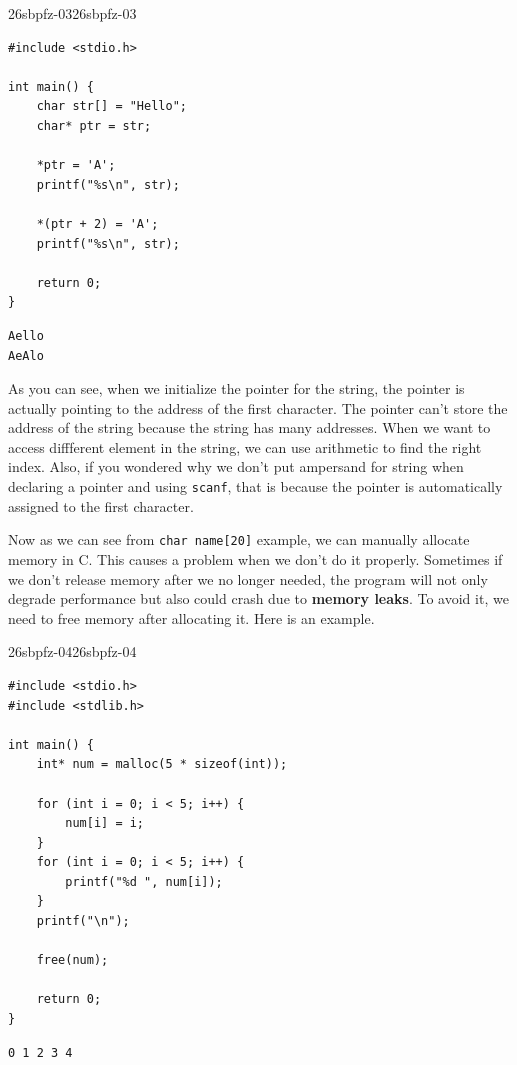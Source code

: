 \documentclass[../../../main.tex]{subfiles}
\begin{document}
\begin{cbox}{26sbpfz-03}{26sbpfz-03}
\begin{lstlisting}[style=cstyle]
#include <stdio.h>

int main() {
    char str[] = "Hello";
    char* ptr = str;

    *ptr = 'A';
    printf("%s\n", str);

    *(ptr + 2) = 'A';
    printf("%s\n", str);

    return 0;
}
\end{lstlisting}
\end{cbox}
\begin{outputbox}
\begin{lstlisting}[style=basic]
Aello
AeAlo
\end{lstlisting}
\end{outputbox}

As you can see, when we initialize the pointer for the string,
the pointer is actually pointing to the address of the first
character. The pointer can't store the address of the string because
the string has many addresses. When we want to access diffferent
element in the string, we can use arithmetic to find the right index.
Also, if you wondered why we don't put ampersand for string when
declaring a pointer and using \verb|scanf|, that is because the
pointer is automatically assigned to the first character.

Now as we can see from \verb|char name[20]| example, we can manually
allocate memory in C. This causes a problem when we don't do it
properly. Sometimes if we don't release memory after we no longer
needed, the program will not only degrade performance but also could
crash due to \textbf{memory leaks}. To avoid it, we need to free
memory after allocating it. Here is an example.

\begin{cbox}{26sbpfz-04}{26sbpfz-04}
\begin{lstlisting}[style=cstyle]
#include <stdio.h>
#include <stdlib.h>

int main() {
    int* num = malloc(5 * sizeof(int));

    for (int i = 0; i < 5; i++) {
        num[i] = i;
    }
    for (int i = 0; i < 5; i++) {
        printf("%d ", num[i]);
    }
    printf("\n");

    free(num);

    return 0;
}
\end{lstlisting}
\end{cbox}
\begin{outputbox}
\begin{lstlisting}[style=basic]
0 1 2 3 4
\end{lstlisting}
\end{outputbox}
\end{document}
